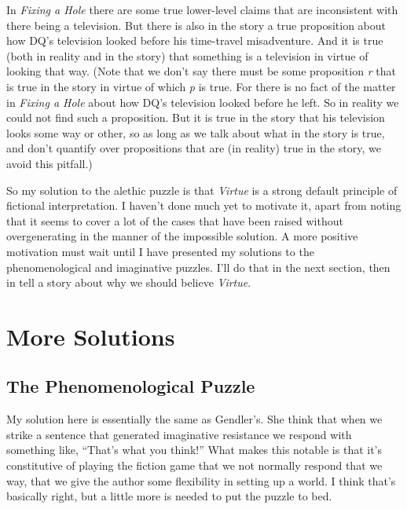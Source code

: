 \documentclass[
  10pt,
  letterpaper,
  DIV=11,
  numbers=noendperiod,
  twoside]{scrartcl}
\begin{document}
In \emph{Fixing a Hole} there are some true lower-level claims that are
inconsistent with there being a television. But there is also in the
story a true proposition about how DQ's television looked before his
time-travel misadventure. And it is true (both in reality and in the
story) that something is a television in virtue of looking that way.
(Note that we don't say there must be some proposition \emph{r} that is
true in the story in virtue of which \emph{p} is true. For there is no
fact of the matter in \emph{Fixing a Hole} about how DQ's television
looked before he left. So in reality we could not find such a
proposition. But it is true in the story that his television looks some
way or other, so as long as we talk about what in the story is true, and
don't quantify over propositions that are (in reality) true in the
story, we avoid this pitfall.)

So my solution to the alethic puzzle is that \emph{Virtue} is a strong
default principle of fictional interpretation. I haven't done much yet
to motivate it, apart from noting that it seems to cover a lot of the
cases that have been raised without overgenerating in the manner of the
impossible solution. A more positive motivation must wait until I have
presented my solutions to the phenomenological and imaginative puzzles.
I'll do that in the next section, then in tell a story about why we
should believe \emph{Virtue}.

\section{More Solutions}\label{more-solutions}

\subsection{The Phenomenological
Puzzle}\label{the-phenomenological-puzzle}

My solution here is essentially the same as Gendler's. She think that
when we strike a sentence that generated imaginative resistance we
respond with something like, ``That's what you think!'' What makes this
notable is that it's constitutive of playing the fiction game that we
not normally respond that we way, that we give the author some
flexibility in setting up a world. I think that's basically right, but a
little more is needed to put the puzzle to bed.
\end{document}
